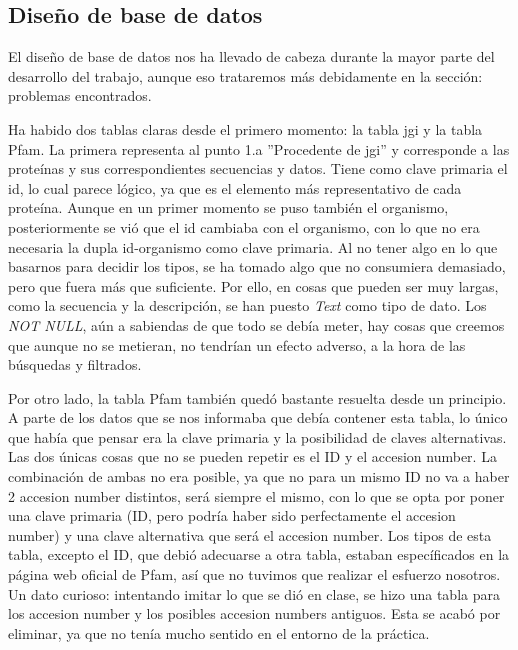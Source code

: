 \documentclass[11pt]{article} %
\begin{document}
\subsection{Dise\~no de base de datos}

El dise\~no de base de datos nos ha llevado de cabeza durante la mayor parte del desarrollo del trabajo, aunque eso trataremos m\'as debidamente en la secci\'on: problemas encontrados.

Ha habido dos tablas claras desde el primero momento: la tabla jgi y la tabla Pfam. La primera representa al punto 1.a ''Procedente de jgi'' y corresponde a las prote\'inas y sus correspondientes secuencias y datos. Tiene como clave primaria el id, lo cual parece l\'ogico, ya que es el elemento m\'as representativo de cada prote\'ina. Aunque en un primer momento se puso tambi\'en el organismo, posteriormente se vi\'o que el id cambiaba con el organismo, con lo que no era necesaria la dupla id-organismo como clave primaria. Al no tener algo en lo que basarnos para decidir los tipos, se ha tomado algo que no consumiera demasiado, pero que fuera m\'as que suficiente. Por ello, en cosas que pueden ser muy largas, como la secuencia y la descripci\'on, se han puesto \emph{Text} como tipo de dato. Los \emph{NOT NULL}, a\'un a sabiendas de que todo se deb\'ia meter, hay cosas que creemos que aunque no se metieran, no tendr\'ian un efecto adverso, a la hora de las b\'usquedas y filtrados.

Por otro lado, la tabla Pfam tambi\'en qued\'o bastante resuelta desde un principio. A parte de los datos que se nos informaba que deb\'ia contener esta tabla, lo \'unico que hab\'ia que pensar era la clave primaria y la posibilidad de claves alternativas. Las dos \'unicas cosas que no se pueden repetir es el ID y el accesion number. La combinaci\'on de ambas no era posible, ya que no para un mismo ID no va a haber 2 accesion number distintos, ser\'a siempre el mismo, con lo que se opta por poner una clave primaria (ID, pero podr\'ia haber sido perfectamente el accesion number) y una clave alternativa que ser\'a el accesion number. Los tipos de esta tabla, excepto el ID, que debi\'o adecuarse a otra tabla, estaban espec\'ificados en la p\'agina web oficial de Pfam, as\'i que no tuvimos que realizar el esfuerzo nosotros. Un dato curioso: intentando imitar lo que se di\'o en clase, se hizo una tabla para los accesion number y los posibles accesion numbers antiguos. Esta se acab\'o por eliminar, ya que no ten\'ia mucho sentido en el entorno de la pr\'actica.
\end{document}
